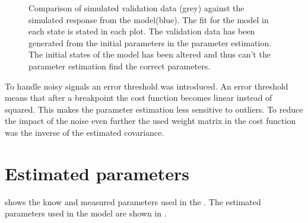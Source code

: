 \begin{figure}[tbp]
  \centering
  \qquad
  \qquad
    \qquad
    \qquad
    \qquad
  \caption{\label{fig:angVelSim}%
    Comparison of simulated validation data (grey) against the simulated response from the model(blue). The fit for the model in each state is stated in each plot. The validation data has been generated from the initial parameters in the parameter estimation. The initial states of the model has been altered and thus can't the parameter estimation find the correct parameters.}
\end{figure}

To handle noisy signals an error threshold was introduced. An error threshold means that after a breakpoint the cost function becomes linear instead of squared. This makes the parameter estimation less sensitive to outliers. To reduce the impact of the noise even further the used weight matrix in the cost function was the inverse of the estimated covariance. 

\section{Estimated parameters}
 shows the know and measured parameters used in the \abbrROV. The estimated parameters used in the \abbrROV model are shown in .

